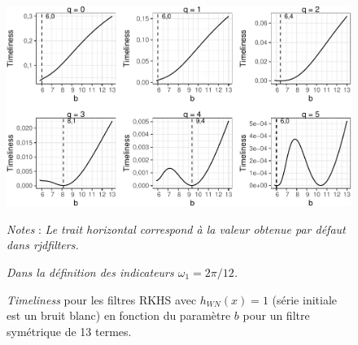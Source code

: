 \documentclass[
  11pt,
  french,
  a4paper]{article}
\newcommand\1{\mathds{1}}
\begin{document}
\begin{figure}[H]

{\centering \includegraphics{img/bookdown/pdf/rkhstimeliness6wn-1} 

}

\caption[\emph{Timeliness} pour les filtres RKHS avec \(h_{WN}(x)=1\) (série initiale est un bruit blanc) en fonction du paramètre \(b\) pour un filtre symétrique de 13 termes]{\emph{Timeliness} pour les filtres RKHS avec \(h_{WN}(x)=1\) (série initiale est un bruit blanc) en fonction du paramètre \(b\) pour un filtre symétrique de 13 termes.}\label{fig:rkhstimeliness6wn}

\footnotesize


\emph{Notes} : \emph{Le trait horizontal correspond à la valeur obtenue par défaut dans rjdfilters.}

\emph{Dans la définition des indicateurs \(\omega_1=2\pi/12\).}
\normalsize\end{figure}
\end{document}
